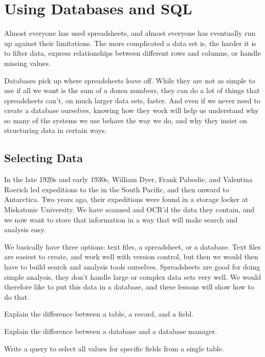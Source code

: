 \chapter{Using Databases and SQL}\label{s:sql}

Almost everyone has used spreadsheets, and almost everyone has
eventually run up against their limitations. The more complicated a data
set is, the harder it is to filter data, express relationships between
different rows and columns, or handle missing values.

Databases pick up where spreadsheets leave off. While they are not as
simple to use if all we want is the sum of a dozen numbers, they can do
a lot of things that spreadsheets can't, on much larger data sets,
faster. And even if we never need to create a database ourselves,
knowing how they work will help us understand why so many of the systems
we use behave the way we do, and why they insist on structuring data in
certain ways.

\section{Selecting Data}

In the late 1920s and early 1930s, William Dyer, Frank Pabodie, and
Valentina Roerich led expeditions to the
 in the South Pacific, and then onward to Antarctica.
Two years ago, their expeditions were found in a storage locker at
Miskatonic University. We have scanned and OCR'd the data they contain,
and we now want to store that information in a way that will make search
and analysis easy.

We basically have three options: text files, a spreadsheet, or a
database. Text files are easiest to create, and work well with version
control, but then we would then have to build search and analysis tools
ourselves. Spreadsheets are good for doing simple analysis, they don't
handle large or complex data sets very well. We would therefore like to
put this data in a database, and these lessons will show how to do that.

\begin{objectives}
\begin{swcitemize}
\item
  Explain the difference between a table, a record, and a field.
\item
  Explain the difference between a database and a database manager.
\item
  Write a query to select all values for specific fields from a single
  table.
\end{swcitemize}
\end{objectives}

